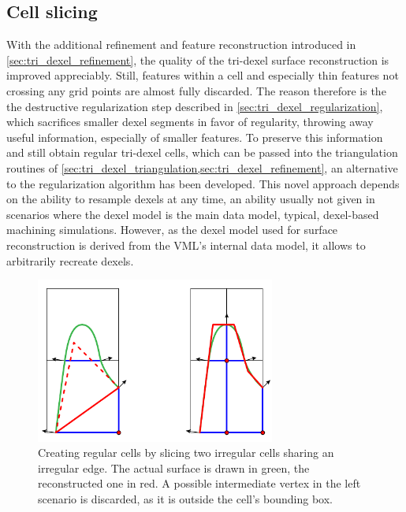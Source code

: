 \subsection{Cell slicing}
\label{sec:tri_dexel_cellslicing}

With the additional refinement and feature reconstruction introduced in \cref{sec:tri_dexel_refinement}, the quality of the tri-dexel surface reconstruction is improved appreciably.
Still, features within a cell and especially thin features not crossing any grid points are almost fully discarded.
The reason therefore is the the destructive regularization step described in \cref{sec:tri_dexel_regularization}, which sacrifices smaller dexel segments in favor of regularity, throwing away useful information, especially of smaller features.
To preserve this information and still obtain regular tri-dexel cells, which can be passed into the triangulation routines of \cref{sec:tri_dexel_triangulation,sec:tri_dexel_refinement}, an alternative to the regularization algorithm has been developed.
This novel approach depends on the ability to resample dexels at any time, an ability usually not given in scenarios where the dexel model is the main data model, \ie typical, dexel-based machining simulations.
However, as the dexel model used for surface reconstruction is derived from the VML's internal data model, it allows to arbitrarily recreate dexels.

\begin{figure}
	\centering
	\includegraphics[width=0.7\textwidth]{images/tri_dexel_cellslicing}
	\caption[Cell slicing]{
		Creating regular cells by slicing two irregular cells sharing an irregular edge.
		The actual surface is drawn in green, the reconstructed one in red.
		A possible intermediate vertex in the left scenario is discarded, as it is outside the cell's bounding box.
	}
	\label{fig:tri_dexel_cellslicing}
\end{figure}

